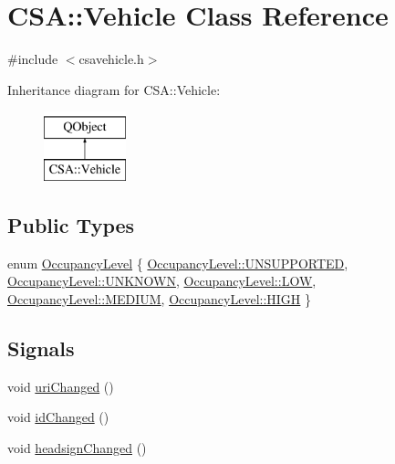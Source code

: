 \hypertarget{classCSA_1_1Vehicle}{}\section{C\+SA\+:\+:Vehicle Class Reference}
\label{classCSA_1_1Vehicle}


{\ttfamily \#include $<$csavehicle.\+h$>$}

Inheritance diagram for C\+SA\+:\+:Vehicle\+:\begin{figure}[H]
\begin{center}
\leavevmode
\includegraphics[height=2.000000cm]{classCSA_1_1Vehicle}
\end{center}
\end{figure}
\subsection*{Public Types}
\begin{DoxyCompactItemize}
\item 
enum \mbox{\hyperlink{classCSA_1_1Vehicle_a331cc81107e5f0a8f37f894729dd9bda}{Occupancy\+Level}} \{ \newline
\mbox{\hyperlink{classCSA_1_1Vehicle_a331cc81107e5f0a8f37f894729dd9bdaa40aa75f8e8cfdf7b660c5620e953229f}{Occupancy\+Level\+::\+U\+N\+S\+U\+P\+P\+O\+R\+T\+ED}}, 
\mbox{\hyperlink{classCSA_1_1Vehicle_a331cc81107e5f0a8f37f894729dd9bdaa696b031073e74bf2cb98e5ef201d4aa3}{Occupancy\+Level\+::\+U\+N\+K\+N\+O\+WN}}, 
\mbox{\hyperlink{classCSA_1_1Vehicle_a331cc81107e5f0a8f37f894729dd9bdaa41bc94cbd8eebea13ce0491b2ac11b88}{Occupancy\+Level\+::\+L\+OW}}, 
\mbox{\hyperlink{classCSA_1_1Vehicle_a331cc81107e5f0a8f37f894729dd9bdaac87f3be66ffc3c0d4249f1c2cc5f3cce}{Occupancy\+Level\+::\+M\+E\+D\+I\+UM}}, 
\newline
\mbox{\hyperlink{classCSA_1_1Vehicle_a331cc81107e5f0a8f37f894729dd9bdaab89de3b4b81c4facfac906edf29aec8c}{Occupancy\+Level\+::\+H\+I\+GH}}
 \}
\end{DoxyCompactItemize}
\subsection*{Signals}
\begin{DoxyCompactItemize}
\item 
void \mbox{\hyperlink{classCSA_1_1Vehicle_ab473f2c81f6e0a0894e525466bfac43f}{uri\+Changed}} ()
\item 
void \mbox{\hyperlink{classCSA_1_1Vehicle_a4db7ec27aa6ef10cf09ac41cfabd2642}{id\+Changed}} ()
\item 
void \mbox{\hyperlink{classCSA_1_1Vehicle_a2de3755a1458b3790852b3fd759136b7}{headsign\+Changed}} ()
\end{DoxyCompactItemize}
